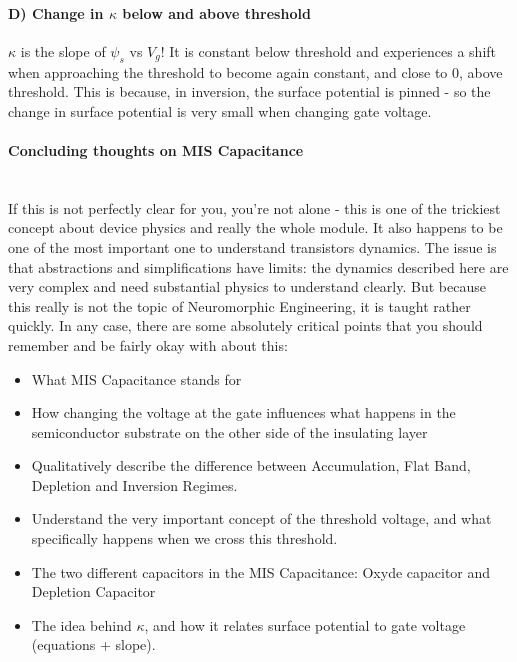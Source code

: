 \paragraph{D) Change in $\kappa$ below and above threshold} $\kappa$ is the slope of $\psi_s$ vs $V_g$! It is constant below threshold and experiences a shift when approaching the threshold to become again constant, and close to 0, above threshold. This is because, in inversion, the surface potential is pinned - so the change in surface potential is very small when changing gate voltage. 

\paragraph{Concluding thoughts on MIS Capacitance}\\

If this is not perfectly clear for you, you're not alone - this is one of the trickiest concept about device physics and really the whole module. It also happens to be one of the most important one to understand transistors dynamics. The issue is that abstractions and simplifications have limits: the dynamics described here are very complex and need substantial physics to understand clearly. But because this really is not the topic of Neuromorphic Engineering, it is taught rather quickly. In any case, there are some absolutely critical points that you should remember and be fairly okay with about this: 

\begin{itemize}
    \item What MIS Capacitance stands for
    \item How changing the voltage at the gate influences what happens in the semiconductor substrate on the other side of the insulating layer
    \item Qualitatively describe the difference between Accumulation, Flat Band, Depletion and Inversion Regimes. 
    \item Understand the very important concept of the threshold voltage, and what specifically happens when we cross this threshold. 
    \item The two different capacitors in the MIS Capacitance: Oxyde capacitor and Depletion Capacitor 
    \item The idea behind $\kappa$, and how it relates surface potential to gate voltage (equations + slope).
\end{itemize}
